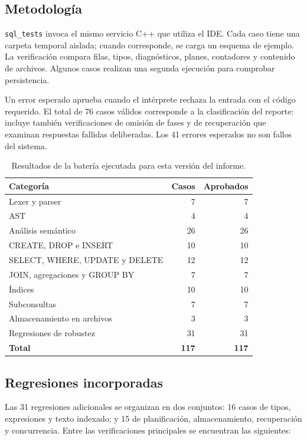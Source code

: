 \documentclass[11pt,a4paper]{article}
\begin{document}
\subsection{Metodología}

\texttt{sql\_tests} invoca el mismo servicio C++ que utiliza el IDE. Cada
caso tiene una carpeta temporal aislada; cuando corresponde, se carga un
esquema de ejemplo. La verificación compara filas, tipos, diagnósticos,
planes, contadores y contenido de archivos. Algunos casos realizan una
segunda ejecución para comprobar persistencia.

Un error esperado aprueba cuando el intérprete rechaza la entrada con
el código requerido. El total de 76 casos válidos corresponde a la
clasificación del reporte: incluye también verificaciones de omisión de
fases y de recuperación que examinan respuestas fallidas deliberadas.
Los 41 errores esperados no son fallos del sistema.

\begin{table}[H]\centering\small
\begin{tabularx}{\textwidth}{@{}Yrr@{}}
\toprule\textbf{Categoría} & \textbf{Casos} & \textbf{Aprobados}\\\midrule
Lexer y parser & 7 & 7\\
AST & 4 & 4\\
Análisis semántico & 26 & 26\\
CREATE, DROP e INSERT & 10 & 10\\
SELECT, WHERE, UPDATE y DELETE & 12 & 12\\
JOIN, agregaciones y GROUP BY & 7 & 7\\
Índices & 10 & 10\\
Subconsultas & 7 & 7\\
Almacenamiento en archivos & 3 & 3\\
Regresiones de robustez & 31 & 31\\\midrule
\textbf{Total} & \textbf{117} & \textbf{117}\\
\bottomrule
\end{tabularx}
\caption{Resultados de la batería ejecutada para esta versión del informe.}
\end{table}

\subsection{Regresiones incorporadas}

Las 31 regresiones adicionales se organizan en dos conjuntos: 16 casos
de tipos, expresiones y texto indexado; y 15 de planificación,
almacenamiento, recuperación y concurrencia. Entre las verificaciones
principales se encuentran las siguientes:
\end{document}
